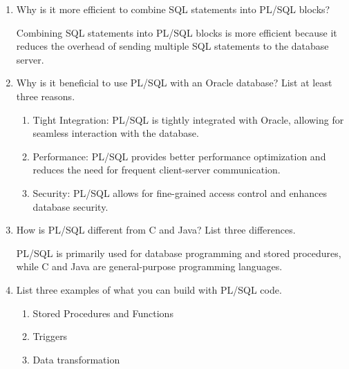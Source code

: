 \documentclass[11pt]{article}
\begin{document}
\begin{enumerate}
\item Why is it more efficient to combine SQL statements into PL/SQL blocks?

Combining SQL statements into PL/SQL blocks is more efficient because it
reduces the overhead of sending multiple SQL statements to the database
server.

\item Why is it beneficial to use PL/SQL with an Oracle database? List at least
three reasons.

\begin{enumerate}
\item Tight Integration: PL/SQL is tightly integrated with Oracle, allowing
for seamless interaction with the database.

\item Performance: PL/SQL provides better performance optimization and
reduces the need for frequent client-server communication.

\item Security: PL/SQL allows for fine-grained access control and enhances
database security.
\end{enumerate}

\item How is PL/SQL different from C and Java? List three differences.

PL/SQL is primarily used for database programming and stored procedures,
while C and Java are general-purpose programming languages.

\item List three examples of what you can build with PL/SQL code.

\begin{enumerate}
\item Stored Procedures and Functions

\item Triggers

\item Data transformation
\end{enumerate}
\end{enumerate}
\end{document}
